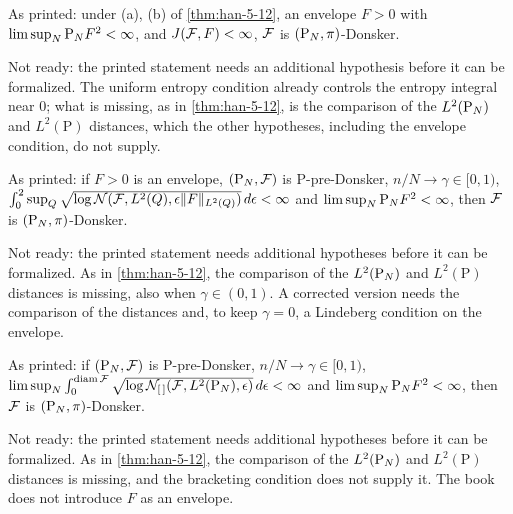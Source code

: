 \begin{corollary}
  \label{cor:han-5-5}
  \notready
  As printed: under (a), (b) of \cref{thm:han-5-12}, an envelope $F>0$ with $\limsup_N\mathrm{P}_N F^2<\infty$, and $J(\mathcal{F},F)<\infty$, $\mathcal{F}$ is $(\mathrm{P}_N,\pi)$-Donsker.
\end{corollary}
\begin{remark}
  Not ready: the printed statement needs an additional hypothesis before it can be formalized. The uniform entropy condition already controls the entropy integral near $0$; what is missing, as in \cref{thm:han-5-12}, is the comparison of the $L^2(\mathrm{P}_N)$ and $L^2(\mathrm P)$ distances, which the other hypotheses, including the envelope condition, do not supply.
\end{remark}

\begin{theorem}
  \label{thm:han-5-13}
  \notready
  As printed: if $F>0$ is an envelope, $(\mathrm{P}_N,\mathcal{F})$ is $\mathrm P$-pre-Donsker, $n/N\to\gamma\in[0,1)$, $\int_0^2\sup_Q\sqrt{\log\mathcal{N}(\mathcal{F},L^2(Q),\epsilon\|F\|_{L^2(Q)})}\,d\epsilon<\infty$ and $\limsup_N\mathrm{P}_N F^2<\infty$, then $\mathcal{F}$ is $(\mathrm{P}_N,\pi)$-Donsker.
\end{theorem}
\begin{remark}
  Not ready: the printed statement needs additional hypotheses before it can be formalized. As in \cref{thm:han-5-12}, the comparison of the $L^2(\mathrm{P}_N)$ and $L^2(\mathrm P)$ distances is missing, also when $\gamma\in(0,1)$. A corrected version needs the comparison of the distances and, to keep $\gamma=0$, a Lindeberg condition on the envelope.
\end{remark}

\begin{theorem}
  \label{thm:han-5-14}
  \notready
  As printed: if $(\mathrm{P}_N,\mathcal{F})$ is $\mathrm P$-pre-Donsker, $n/N\to\gamma\in[0,1)$, $\limsup_N\int_0^{\operatorname{diam}\mathcal{F}}\sqrt{\log\mathcal{N}_{[\,]}(\mathcal{F},L^2(\mathrm{P}_N),\epsilon)}\,d\epsilon<\infty$ and $\limsup_N\mathrm{P}_N F^2<\infty$, then $\mathcal{F}$ is $(\mathrm{P}_N,\pi)$-Donsker.
\end{theorem}
\begin{remark}
  Not ready: the printed statement needs additional hypotheses before it can be formalized. As in \cref{thm:han-5-12}, the comparison of the $L^2(\mathrm{P}_N)$ and $L^2(\mathrm P)$ distances is missing, and the bracketing condition does not supply it. The book does not introduce $F$ as an envelope.
\end{remark}

